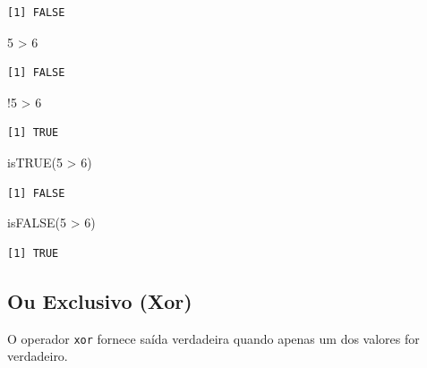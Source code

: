 \documentclass[
  letterpaper,
  DIV=11,
  numbers=noendperiod]{scrreprt}
\newenvironment{Shaded}{\begin{snugshade}}{\end{snugshade}}
\newcommand{\DecValTok}[1]{\textcolor[rgb]{0.68,0.00,0.00}{#1}}
\newcommand{\FunctionTok}[1]{\textcolor[rgb]{0.28,0.35,0.67}{#1}}
\newcommand{\NormalTok}[1]{\textcolor[rgb]{0.00,0.23,0.31}{#1}}
\newcommand{\SpecialCharTok}[1]{\textcolor[rgb]{0.37,0.37,0.37}{#1}}
\begin{document}
\begin{verbatim}
[1] FALSE
\end{verbatim}

\begin{Shaded}
\begin{Highlighting}[]
\DecValTok{5} \SpecialCharTok{\textgreater{}} \DecValTok{6}
\end{Highlighting}
\end{Shaded}

\begin{verbatim}
[1] FALSE
\end{verbatim}

\begin{Shaded}
\begin{Highlighting}[]
\SpecialCharTok{!}\DecValTok{5} \SpecialCharTok{\textgreater{}} \DecValTok{6}
\end{Highlighting}
\end{Shaded}

\begin{verbatim}
[1] TRUE
\end{verbatim}

\begin{Shaded}
\begin{Highlighting}[]
\FunctionTok{isTRUE}\NormalTok{(}\DecValTok{5} \SpecialCharTok{\textgreater{}} \DecValTok{6}\NormalTok{)}
\end{Highlighting}
\end{Shaded}

\begin{verbatim}
[1] FALSE
\end{verbatim}

\begin{Shaded}
\begin{Highlighting}[]
\FunctionTok{isFALSE}\NormalTok{(}\DecValTok{5} \SpecialCharTok{\textgreater{}} \DecValTok{6}\NormalTok{)}
\end{Highlighting}
\end{Shaded}

\begin{verbatim}
[1] TRUE
\end{verbatim}

\hypertarget{ou-exclusivo-xor}{%
\subsection{Ou Exclusivo (Xor)}\label{ou-exclusivo-xor}}

O operador \texttt{xor} fornece saída verdadeira quando apenas um dos
valores for verdadeiro.
\end{document}
